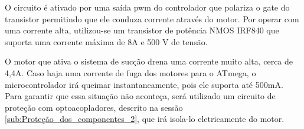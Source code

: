 		O circuito é ativado por uma saída pwm do controlador que polariza o gate do transistor permitindo que ele conduza corrente através do motor. Por operar com uma corrente alta, utilizou-se um transistor de potência NMOS IRF840 que suporta uma corrente máxima de 8A e 500 V de tensão.

		O motor que ativa o sistema de sucção drena uma corrente muito alta, cerca de 4,4A. Caso haja uma corrente de fuga dos motores para o ATmega, o microcontrolador irá queimar instantaneamente, pois ele suporta até 500mA. Para garantir que essa situação não aconteça, será utilizado um circuito de proteção com optoacopladores, descrito na sessão \ref{sub:Proteção_dos_componentes_2}, que irá isola-lo eletricamente do motor.


